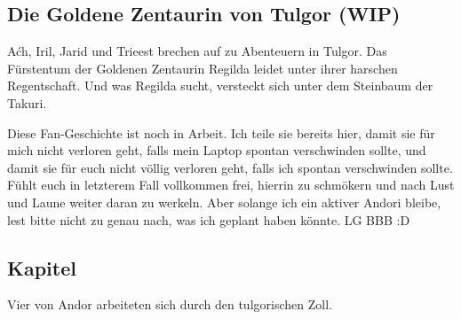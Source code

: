 \begin{chapterbox}
    \chapter{Die Goldene Zentaurin von Tulgor (WIP)}
    \label{wip-goldene-zentaurin-von-tulgor}

    Aćh, Iril, Jarid und Trieest brechen auf zu Abenteuern in Tulgor. Das Fürstentum der Goldenen Zentaurin Regilda leidet unter ihrer harschen Regentschaft. Und was Regilda sucht, versteckt sich unter dem Steinbaum der Takuri.
\end{chapterbox}



Diese Fan-Geschichte ist noch in Arbeit. Ich teile sie bereits hier, damit sie für mich nicht verloren geht, falls mein Laptop spontan verschwinden sollte, und damit sie für euch nicht völlig verloren geht, falls ich spontan verschwinden sollte. Fühlt euch in letzterem Fall vollkommen frei, hierrin zu schmökern und nach Lust und Laune weiter daran zu werkeln. Aber solange ich ein aktiver Andori bleibe, lest bitte nicht zu genau nach, was ich geplant haben könnte. LG BBB :D



\newpage
\section{Kapitel}

Vier  von Andor arbeiteten sich durch den tulgorischen Zoll.